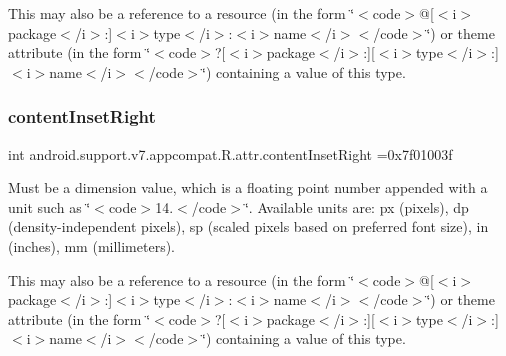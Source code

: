 This may also be a reference to a resource (in the form \char`\"{}$<$code$>$@\mbox{[}$<$i$>$package$<$/i$>$\+:\mbox{]}$<$i$>$type$<$/i$>$\+:$<$i$>$name$<$/i$>$$<$/code$>$\char`\"{}) or theme attribute (in the form \char`\"{}$<$code$>$?\mbox{[}$<$i$>$package$<$/i$>$\+:\mbox{]}\mbox{[}$<$i$>$type$<$/i$>$\+:\mbox{]}$<$i$>$name$<$/i$>$$<$/code$>$\char`\"{}) containing a value of this type. \mbox{\label{classandroid_1_1support_1_1v7_1_1appcompat_1_1R_1_1attr_a608654504a7bff330119bfa1462d385a}} 
\subsubsection{\texorpdfstring{content\+Inset\+Right}{contentInsetRight}}
{\footnotesize\ttfamily int android.\+support.\+v7.\+appcompat.\+R.\+attr.\+content\+Inset\+Right =0x7f01003f\hspace{0.3cm}{\ttfamily [static]}}

Must be a dimension value, which is a floating point number appended with a unit such as \char`\"{}$<$code$>$14.\+5sp$<$/code$>$\char`\"{}. Available units are\+: px (pixels), dp (density-\/independent pixels), sp (scaled pixels based on preferred font size), in (inches), mm (millimeters). 

This may also be a reference to a resource (in the form \char`\"{}$<$code$>$@\mbox{[}$<$i$>$package$<$/i$>$\+:\mbox{]}$<$i$>$type$<$/i$>$\+:$<$i$>$name$<$/i$>$$<$/code$>$\char`\"{}) or theme attribute (in the form \char`\"{}$<$code$>$?\mbox{[}$<$i$>$package$<$/i$>$\+:\mbox{]}\mbox{[}$<$i$>$type$<$/i$>$\+:\mbox{]}$<$i$>$name$<$/i$>$$<$/code$>$\char`\"{}) containing a value of this type. \mbox{\label{classandroid_1_1support_1_1v7_1_1appcompat_1_1R_1_1attr_a24763fb35393b1e0a6c6b9057f47fc22}} 
